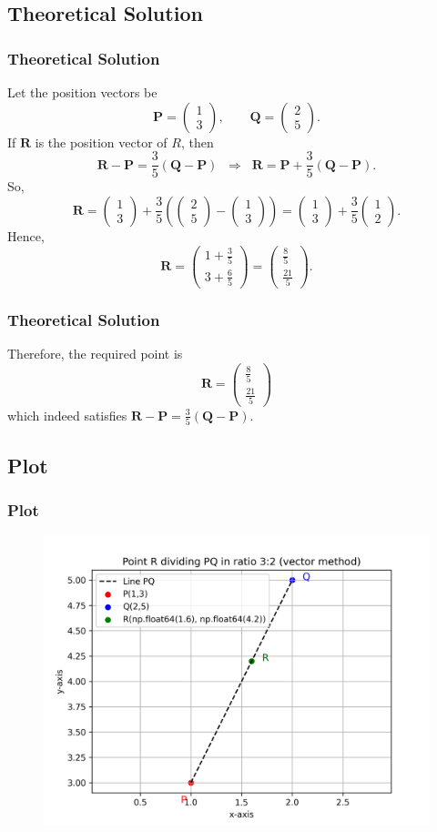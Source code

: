 \documentclass{beamer}
\theoremstyle{remark}
\newcommand{\myvec}[1]{\ensuremath{\begin{pmatrix}#1\end{pmatrix}}}
\let\vec\mathbf
\numberwithin{equation}{section}
\begin{document}
\subsection{Theoretical Solution }
\begin{frame}
\frametitle{Theoretical Solution}

Let the position vectors be
$$
\vec{P} = \myvec{1 \\ 3}, \qquad
\vec{Q} = \myvec{2 \\ 5}.
$$
If \(\vec{R}\) is the position vector of \(R\), then
$$
\vec{R} - \vec{P} = \frac{3}{5}(\vec{Q} - \vec{P})
\;\;\Longrightarrow\;\;
\vec{R} = \vec{P} + \frac{3}{5}(\vec{Q} - \vec{P}).
$$
So,
$$
\vec{R}
= \myvec{1 \\ 3}
+ \frac{3}{5}\left(\myvec{2 \\ 5} - \myvec{1 \\ 3}\right)
= \myvec{1 \\ 3} + \frac{3}{5}\myvec{1 \\ 2}.
$$
Hence,
$$
\vec{R} = \myvec{1+\frac{3}{5} \\[4pt] 3+\frac{6}{5}}
= \myvec{\frac{8}{5} \\[6pt] \frac{21}{5}}.
$$

\end{frame}
\begin{frame}
\frametitle{Theoretical Solution}

Therefore, the required point is
$$
\boxed{\;\vec{R} = \myvec{\frac{8}{5} \\[6pt] \frac{21}{5}}\;}
$$
which indeed satisfies \(\vec{R} - \vec{P} = \frac{3}{5}(\vec{Q} - \vec{P})\).


\end{frame}

\subsection{Plot}
\begin{frame}
    \frametitle{Plot}
\begin{figure}[H]
   \centering
   \includegraphics[width=0.9\columnwidth]{figs/PQ_R_plot.png}
   \end{figure}
\end{frame}
\end{document}
